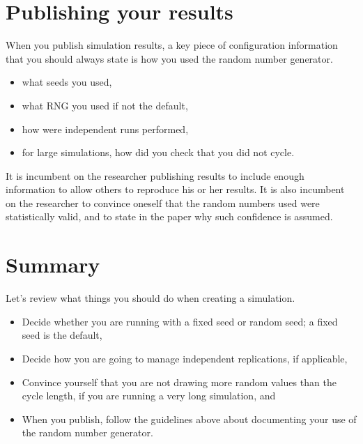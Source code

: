 \documentclass[letterpaper,10pt,english]{sphinxmanual}
\begin{document}
\section{Publishing your results}
\label{\detokenize{random-variables:publishing-your-results}}
When you publish simulation results, a key piece of configuration
information that you should always state is how you used the
random number generator.
\begin{itemize}
\item {} 
what seeds you used,

\item {} 
what RNG you used if not the default,

\item {} 
how were independent runs performed,

\item {} 
for large simulations, how did you check that you did not cycle.

\end{itemize}

It is incumbent on the researcher publishing results to include enough
information to allow others to reproduce his or her results. It is also
incumbent on the researcher to convince oneself that the random numbers used
were statistically valid, and to state in the paper why such confidence is
assumed.


\section{Summary}
\label{\detokenize{random-variables:summary}}
Let’s review what things you should do when creating a simulation.
\begin{itemize}
\item {} 
Decide whether you are running with a fixed seed or random seed; a fixed seed
is the default,

\item {} 
Decide how you are going to manage independent replications, if applicable,

\item {} 
Convince yourself that you are not drawing more random values than the cycle
length, if you are running a very long simulation, and

\item {} 
When you publish, follow the guidelines above about documenting your use of
the random number generator.

\end{itemize}
\end{document}
